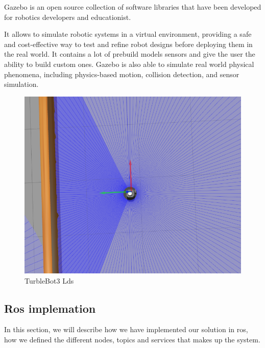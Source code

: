 \documentclass[12pt]{extarticle}
\begin{document}
Gazebo is an open source collection of software libraries that have been developed for robotics developers and educationist.

It allows  to simulate  robotic systems in a virtual environment, providing a safe and cost-effective way to test and refine robot designs before deploying them in the real world. It contains a lot of prebuild models sensors and give the user the ability to build custom ones. Gazebo is also able to simulate real world physical phenomena, including physics-based motion, collision detection, and sensor simulation.

  
 \begin{figure}[h]  
\centering
\includegraphics[scale=0.4]{lds.png}
\caption[Lds]{TurbleBot3 Lds}
\end{figure}






 
   











 

\subsection{Ros implemation}
In this section, we will describe how we have implemented our solution in ros, how we defined the different nodes, topics and services that makes up the system.
\end{document}
